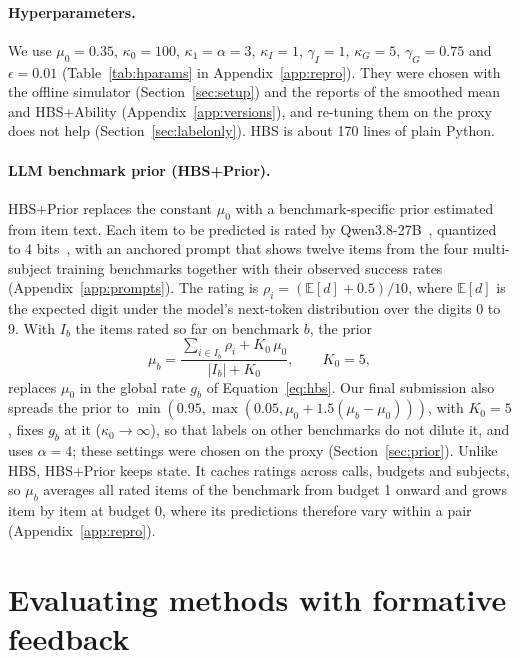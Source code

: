 \documentclass{article}
\begin{document}
\paragraph{Hyperparameters.} We use $\mu_0 = 0.35$, $\kappa_0 = 100$, $\kappa_1 = \alpha = 3$, $\kappa_I = 1$, $\gamma_I = 1$, $\kappa_G = 5$, $\gamma_G = 0.75$ and $\epsilon = 0.01$ (Table~\ref{tab:hparams} in Appendix~\ref{app:repro}). They were chosen with the offline simulator (Section~\ref{sec:setup}) and the reports of the smoothed mean and HBS+Ability (Appendix~\ref{app:versions}), and re-tuning them on the proxy does not help (Section~\ref{sec:labelonly}). HBS is about 170 lines of plain Python.

\paragraph{LLM benchmark prior (HBS+Prior).} HBS+Prior replaces the constant $\mu_0$ with a benchmark-specific prior estimated from item text. Each item to be predicted is rated by Qwen3.8-27B~\citep{qwen38}, quantized to 4 bits~\citep{dettmers2023qlora}, with an anchored prompt that shows twelve items from the four multi-subject training benchmarks together with their observed success rates (Appendix~\ref{app:prompts}). The rating is $\rho_i = (\mathbb{E}[d] + 0.5)/10$, where $\mathbb{E}[d]$ is the expected digit under the model's next-token distribution over the digits 0 to 9. With $I_b$ the items rated so far on benchmark $b$, the prior
\begin{equation}
  \mu_b = \frac{\sum_{i \in I_b} \rho_i + K_0 \, \mu_0}{|I_b| + K_0}, \qquad K_0 = 5,
  \label{eq:prior}
\end{equation}
replaces $\mu_0$ in the global rate $g_b$ of Equation~\eqref{eq:hbs}. Our final submission also spreads the prior to $\min(0.95, \max(0.05, \mu_0 + 1.5(\mu_b - \mu_0)))$, with $K_0 = 5$, fixes $g_b$ at it ($\kappa_0 \to \infty$), so that labels on other benchmarks do not dilute it, and uses $\alpha = 4$; these settings were chosen on the proxy (Section~\ref{sec:prior}). Unlike HBS, HBS+Prior keeps state. It caches ratings across calls, budgets and subjects, so $\mu_b$ averages all rated items of the benchmark from budget 1 onward and grows item by item at budget 0, where its predictions therefore vary within a pair (Appendix~\ref{app:repro}).

\section{Evaluating methods with formative feedback}
\label{sec:proxy}
\end{document}
